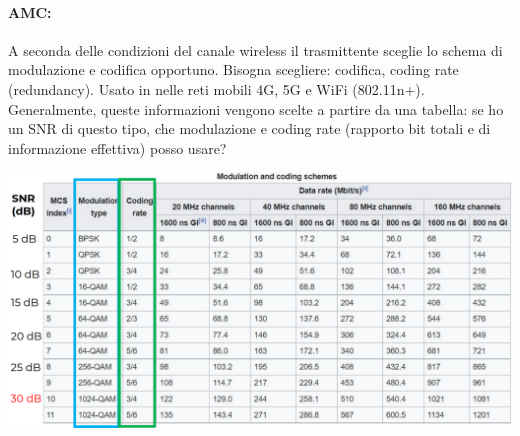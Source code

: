 \paragraph{AMC:} A seconda delle condizioni del canale wireless il trasmittente sceglie lo schema di modulazione e codifica opportuno. Bisogna scegliere: codifica, coding rate (redundancy). Usato in nelle reti mobili 4G, 5G e WiFi (802.11n+).\\

Generalmente, queste informazioni vengono scelte a partire da una tabella: se ho un SNR di questo tipo, che modulazione e coding rate (rapporto bit totali e di informazione effettiva) posso usare?  
\begin{center}
	\includegraphics[width=0.95\linewidth]{img/wireless/mcruppolo}
\end{center}



\newpage

